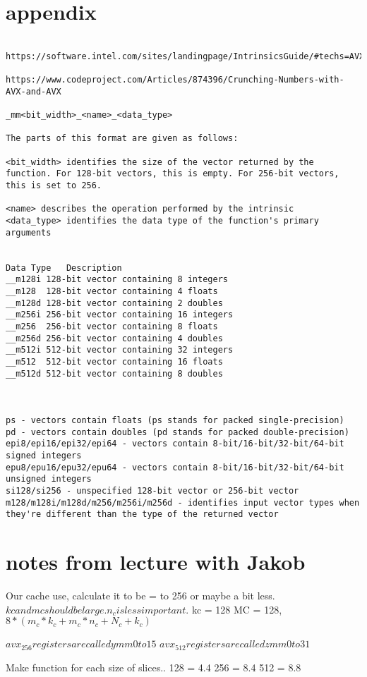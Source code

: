 \documentclass[a4paper,10pt,titlepage]{report}
\begin{document}
\section{appendix}
\begin{lstlisting}
 https://software.intel.com/sites/landingpage/IntrinsicsGuide/#techs=AVX_512&cats=Elementary%20Math%20Functions,Load 
	
https://www.codeproject.com/Articles/874396/Crunching-Numbers-with-AVX-and-AVX

_mm<bit_width>_<name>_<data_type> 

The parts of this format are given as follows:

<bit_width> identifies the size of the vector returned by the function. For 128-bit vectors, this is empty. For 256-bit vectors, this is set to 256.

<name> describes the operation performed by the intrinsic
<data_type> identifies the data type of the function's primary arguments


Data Type	Description
__m128i	128-bit vector containing 8 integers
__m128	128-bit vector containing 4 floats
__m128d	128-bit vector containing 2 doubles
__m256i	256-bit vector containing 16 integers
__m256	256-bit vector containing 8 floats
__m256d	256-bit vector containing 4 doubles
__m512i	512-bit vector containing 32 integers
__m512	512-bit vector containing 16 floats
__m512d	512-bit vector containing 8 doubles



ps - vectors contain floats (ps stands for packed single-precision)
pd - vectors contain doubles (pd stands for packed double-precision)
epi8/epi16/epi32/epi64 - vectors contain 8-bit/16-bit/32-bit/64-bit signed integers
epu8/epu16/epu32/epu64 - vectors contain 8-bit/16-bit/32-bit/64-bit unsigned integers
si128/si256 - unspecified 128-bit vector or 256-bit vector
m128/m128i/m128d/m256/m256i/m256d - identifies input vector types when they're different than the type of the returned vector

\end{lstlisting}

\section{notes from lecture with Jakob}

Our cache use, calculate it to be = to 256 or maybe a bit less.
$kc and mc should be large. n_c is less important.$
kc = 128 MC = 128, 
$8* (m_c*k_c+m_c*n_c+N_c+k_c)$


$avx_256 registers are called ymm0 to 15$
$avx_512 registers are called zmm0 to 31$


Make function for each size of slices..
128 = 4.4 
256 = 8.4 
512 = 8.8
\end{document}
